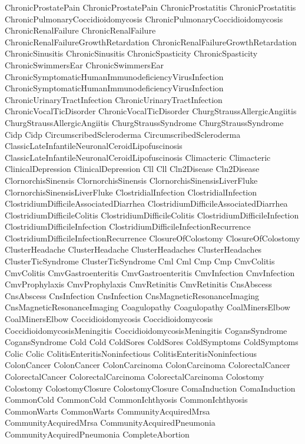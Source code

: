  ChronicProstatePain
 ChronicProstatePain
 ChronicProstatitis
 ChronicProstatitis
 ChronicPulmonaryCoccidioidomycosis
 ChronicPulmonaryCoccidioidomycosis
 ChronicRenalFailure
 ChronicRenalFailure
 ChronicRenalFailureGrowthRetardation
 ChronicRenalFailureGrowthRetardation
 ChronicSinusitis
 ChronicSinusitis
 ChronicSpasticity
 ChronicSpasticity
 ChronicSwimmersEar
 ChronicSwimmersEar
 ChronicSymptomaticHumanImmunodeficiencyVirusInfection
 ChronicSymptomaticHumanImmunodeficiencyVirusInfection
 ChronicUrinaryTractInfection
 ChronicUrinaryTractInfection
 ChronicVocalTicDisorder
 ChronicVocalTicDisorder
 ChurgStraussAllergicAngiitis
 ChurgStraussAllergicAngiitis
 ChurgStraussSyndrome
 ChurgStraussSyndrome
 Cidp
 Cidp
 CircumscribedScleroderma
 CircumscribedScleroderma
 ClassicLateInfantileNeuronalCeroidLipofuscinosis
 ClassicLateInfantileNeuronalCeroidLipofuscinosis
 Climacteric
 Climacteric
 ClinicalDepression
 ClinicalDepression
 Cll
 Cll
 Cln2Disease
 Cln2Disease
 ClornorchisSinensis
 ClornorchisSinensis
 ClornorchisSinensisLiverFluke
 ClornorchisSinensisLiverFluke
 ClostridialInfection
 ClostridialInfection
 ClostridiumDifficileAssociatedDiarrhea
 ClostridiumDifficileAssociatedDiarrhea
 ClostridiumDifficileColitis
 ClostridiumDifficileColitis
 ClostridiumDifficileInfection
 ClostridiumDifficileInfection
 ClostridiumDifficileInfectionRecurrence
 ClostridiumDifficileInfectionRecurrence
 ClosureOfColostomy
 ClosureOfColostomy
 ClusterHeadache
 ClusterHeadache
 ClusterHeadaches
 ClusterHeadaches
 ClusterTicSyndrome
 ClusterTicSyndrome
 Cml
 Cml
 Cmp
 Cmp
 CmvColitis
 CmvColitis
 CmvGastroenteritis
 CmvGastroenteritis
 CmvInfection
 CmvInfection
 CmvProphylaxis
 CmvProphylaxis
 CmvRetinitis
 CmvRetinitis
 CnsAbscess
 CnsAbscess
 CnsInfection
 CnsInfection
 CnsMagneticResonanceImaging
 CnsMagneticResonanceImaging
 Coagulopathy
 Coagulopathy
 CoalMinersElbow
 CoalMinersElbow
 Coccidioidomycosis
 Coccidioidomycosis
 CoccidioidomycosisMeningitis
 CoccidioidomycosisMeningitis
 CogansSyndrome
 CogansSyndrome
 Cold
 Cold
 ColdSores
 ColdSores
 ColdSymptoms
 ColdSymptoms
 Colic
 Colic
 ColitisEnteritisNoninfectious
 ColitisEnteritisNoninfectious
 ColonCancer
 ColonCancer
 ColonCarcinoma
 ColonCarcinoma
 ColorectalCancer
 ColorectalCancer
 ColorectalCarcinoma
 ColorectalCarcinoma
 Colostomy
 Colostomy
 ColostomyClosure
 ColostomyClosure
 ComaInduction
 ComaInduction
 CommonCold
 CommonCold
 CommonIchthyosis
 CommonIchthyosis
 CommonWarts
 CommonWarts
 CommunityAcquiredMrsa
 CommunityAcquiredMrsa
 CommunityAcquiredPneumonia
 CommunityAcquiredPneumonia
 CompleteAbortion
